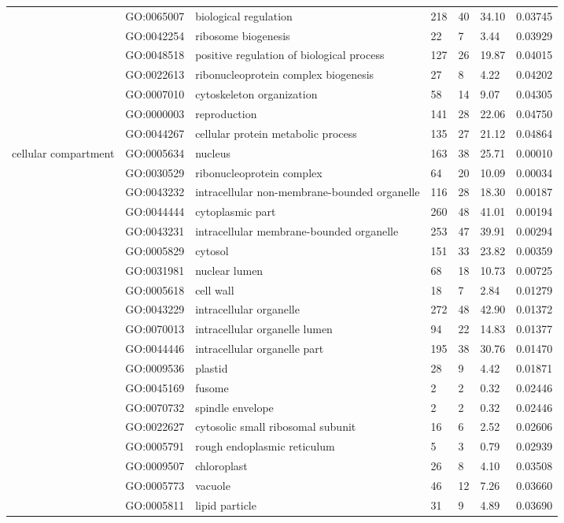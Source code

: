 \documentclass[10pt]{bmc_article}
\newenvironment{bmcformat}{\begin{raggedright}\baselineskip20pt\sloppy\setboolean{publ}{false}}{\end{raggedright}\baselineskip20pt\sloppy}
\begin{document}
\begin{bmcformat}
\begin{longtable}{p{1.7cm}lp{4.5cm}p{1cm}p{1cm}ll}
   & GO:0065007 & biological regulation & 218 &  40 & 34.10 & 0.03745 \\ 
   & GO:0042254 & ribosome biogenesis &  22 &   7 & 3.44 & 0.03929 \\ 
   & GO:0048518 & positive regulation of biological process & 127 &  26 & 19.87 & 0.04015 \\ 
   & GO:0022613 & ribonucleoprotein complex biogenesis &  27 &   8 & 4.22 & 0.04202 \\ 
   & GO:0007010 & cytoskeleton organization &  58 &  14 & 9.07 & 0.04305 \\ 
   & GO:0000003 & reproduction & 141 &  28 & 22.06 & 0.04750 \\ 
   & GO:0044267 & cellular protein metabolic process & 135 &  27 & 21.12 & 0.04864 \\ 
   \hline
cellular compartment & GO:0005634 & nucleus & 163 &  38 & 25.71 & 0.00010 \\ 
   & GO:0030529 & ribonucleoprotein complex &  64 &  20 & 10.09 & 0.00034 \\ 
   & GO:0043232 & intracellular non-membrane-bounded organelle & 116 &  28 & 18.30 & 0.00187 \\ 
   & GO:0044444 & cytoplasmic part & 260 &  48 & 41.01 & 0.00194 \\ 
   & GO:0043231 & intracellular membrane-bounded organelle & 253 &  47 & 39.91 & 0.00294 \\ 
   & GO:0005829 & cytosol & 151 &  33 & 23.82 & 0.00359 \\ 
   & GO:0031981 & nuclear lumen &  68 &  18 & 10.73 & 0.00725 \\ 
   & GO:0005618 & cell wall &  18 &   7 & 2.84 & 0.01279 \\ 
   & GO:0043229 & intracellular organelle & 272 &  48 & 42.90 & 0.01372 \\ 
   & GO:0070013 & intracellular organelle lumen &  94 &  22 & 14.83 & 0.01377 \\ 
   & GO:0044446 & intracellular organelle part & 195 &  38 & 30.76 & 0.01470 \\ 
   & GO:0009536 & plastid &  28 &   9 & 4.42 & 0.01871 \\ 
   & GO:0045169 & fusome &   2 &   2 & 0.32 & 0.02446 \\ 
   & GO:0070732 & spindle envelope &   2 &   2 & 0.32 & 0.02446 \\ 
   & GO:0022627 & cytosolic small ribosomal subunit &  16 &   6 & 2.52 & 0.02606 \\ 
   & GO:0005791 & rough endoplasmic reticulum &   5 &   3 & 0.79 & 0.02939 \\ 
   & GO:0009507 & chloroplast &  26 &   8 & 4.10 & 0.03508 \\ 
   & GO:0005773 & vacuole &  46 &  12 & 7.26 & 0.03660 \\ 
   & GO:0005811 & lipid particle &  31 &   9 & 4.89 & 0.03690 \\ 
   \hline
\hline
\end{longtable}
\newpage


\end{bmcformat}
\end{document}

